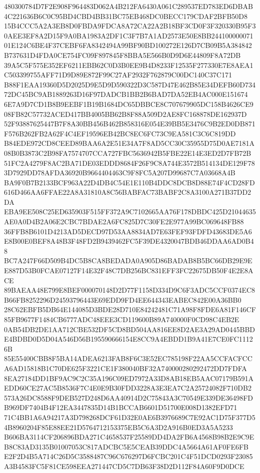 \documentclass[UTF8,fontset=fandol,zihao=-4,a4paper]{ctexart}
\begin{document}
{{480300784D7F2E908F964483D062A4B212FA6430A061C289537ED783ED6DBAB4C221636B6C0C95BD4CBD4BB31BC75EB468DC0BECC179CDAF2BFB50D8
15B4CCC5A2A3EB8D0FBDA9FDCA8A72CA22A2B18BF3CD0F3F320330B95F30AEE3EF8A2D15F9A0BA1983A2DF1C3F7B7A1AD2573E50E8BB244100000071
01E124C6BE4F37CEBF6FA8342494A99BF90BD100272E126D7CB09B5A384842B737631D4FDA0CE754FC09F897845F8BBA5E566B0D9D6E44809F8A72DB
39A5C5F575E352EF6211EBB62C0D3B0EE9B4D8233F12535F277330E7E8AEA1C503399755AFF71D9D89E872F99C27AF2932F762879C00DC140C37C171
B88F1EAA19360D5D2025D9E5D9D590322D3C587D47E462B85E34DEFB60D73472DC45BC9AB1889263D16F97DADCB1BB2B6BAD7DA52EB4AC000E151674
6E7A9D7CD1B8B9EEBF1B19B1684DC65DBBCE8C707679905DC158B4626CE908FB82C57732ACED417BB4005BB62B8F88A509D2AE8FC168878DE162937D
52F93887625447B7F8A30BB456B462B858316E054E39BB5E3476C9B2ED0DB871F576B262FB2A62F4C4EF19596EB42BC8EC6FC73C9EA581C3C6C819DD
B84EDE972CD8CEED89BAA6A2E51E34A7F8AD5CC30C35955D75D0AE7181A08B0B3873C2B98FA7574707CCA727FBC5636942B5FBE22E14E3ED2D7FB72B
51FC2A4279F8AC2BA71DE03EDDD8684F26F9C8A744E3572B514134DE129F783D7929DD78AFDA36920B9664404463C9F8FC5A207D99687C7A03668A4B
BA9F0B7B2133BCF963A22D4DB4C54E1E110B4DDC8DCB8D88E74F4CD28FD616D466AA6FFAE22A8A31810A8C56BABFAC73BABF2C8A3100A271B37DD2DA
EBA9EE508C25ED635903F515FF372A9C7102665AA76F178DBDC425D21044635AE0A0D4B2A06E2CBC7BDAE2A6FC825D7C30FE2E977A99BC069648FB88
36FFB8B6101D4213AD5DECD97D53AA8834AD7E63FEF93FDFD43683DE5A6E8B00E0BEF8A48B3F48FD2B9439462FC5F39DE4320047BDB46DDAA6AD0B48
BC7A247F66D509B4DC5B8CA8BEDADA0A905D86BADAB8B5BC66DB29E9EE887D53B0FCAE07127F14E32F48C7DB256BC831EFF3FC22675DB50F4E2E8ACE
89BAEAA48E799E8BEF000070148D2D77F1158D334D9C6F3ADC5CCF0374EC8B66FB8252296D24593796443E69EDD9FD4EE644343EABEC842E00A36BB0
28C62EBFB5DB64E144085D3BDE28D710E84242481C71A98F8FDE6A81F146CF85FB9677F1484CB6777ADC48EEE3CD119600B89A740000F0CD98C4EB2E
0AB54DB2DE1AA712CBE532DF5CD8BD504AA816EE8D2AE3A29AD0445BBDE4BDBD0D5D04A546D56B195590666154E8CC9A4EBDD1B9A41E7CE0FC11126B
85E55400CBB8F5BA14ADEA6213FAB8F6C3E52EC785198F22AA5CCFACFCCA6AD15818B1C70DE625F3221CE1F380040BF32A740000280292472DD7FDFA
8EA27184DD1BF9AC9C2C35A196C09ED7972A33D8AB18EB5AAC07179B591AEDD60CE27AC5B8536F7C4E0E9B30FDD3228A3E3EA7C2A25724082F710DB2
573A26DC8588F9DEB527D248D6AA40914D2C75843A3C70549E339DE36498FDB969DF7404B4F12EA3447835D14B1BCCAB6601D51700E008D1382EFD71
71C4BB1A6A94217A3D798268DCF61D32E0AE6B3976689C7E92AC1D75F377D54B8960204F85E88EE21D5764712153375EB5C6A3D2A916B0ED3A5A5233
B606BA3114CF206896BDA271C4658537F25589DD4DA2FB6A4568B98B2E9C9EB8C83AD3135B01007053C817ADCBC5E5CEAB39DDC4A5664A61AF0FE6FB
E2F2D4B5A714C26D5C3588487C96C676297D6FCBC201C4F51DCD0293F23085A3B4583FC5F81CE598EEA271447CD5C7DB63F38D2D112F84A60F9D0DCE
}}
\end{document}
